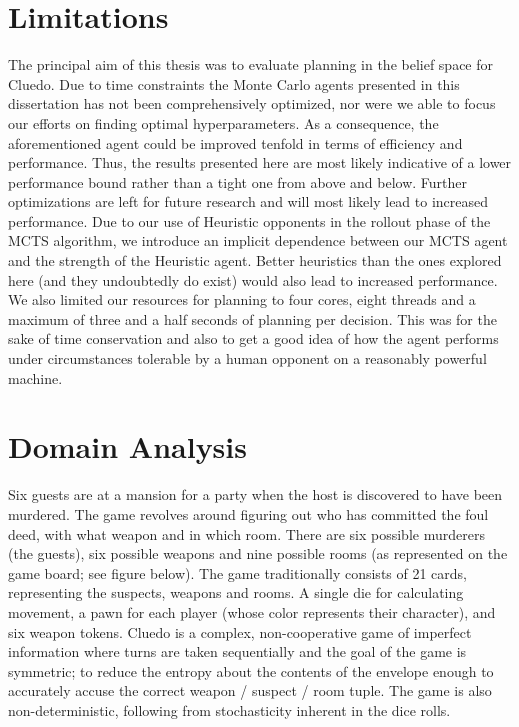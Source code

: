 \documentclass[msc, ai, twoside, notimes, logo, parskip, leftchapter, normalheadings]{infthesis}
\begin{document}
\section{Limitations}
The principal aim of this thesis was to evaluate planning in the belief space for Cluedo. Due to time constraints the Monte Carlo agents presented in this dissertation has not been comprehensively optimized, nor were we able to focus our efforts on finding optimal hyperparameters. As a consequence, the aforementioned agent could be improved tenfold in terms of efficiency and performance. Thus, the results presented here are most likely indicative of a lower performance bound rather than a tight one from above and below. Further optimizations are left for future research and will most likely lead to increased performance. Due to our use of Heuristic opponents in the rollout phase of the MCTS algorithm, we introduce an implicit dependence between our MCTS agent and the strength of the Heuristic agent. Better heuristics than the ones explored here (and they undoubtedly do exist) would also lead to increased performance. We also limited our resources for planning to four cores, eight threads and a maximum of three and a half seconds of planning per decision. This was for the sake of time conservation and also to get a good idea of how the agent performs under circumstances tolerable by a human opponent on a reasonably powerful machine. 

\section{Domain Analysis}
Six guests are at a mansion for a party when the host is discovered to have been murdered. The game revolves around figuring out who has committed the foul deed, with what weapon and in which room. There are six possible murderers (the guests), six possible weapons and nine possible rooms (as represented on the game board; see figure below). The game traditionally consists of 21 cards, representing the suspects, weapons and rooms. A single die for calculating movement, a pawn for each player (whose color represents their character), and six weapon tokens. Cluedo is a complex, non-cooperative game of imperfect information where turns are taken sequentially and the goal of the game is symmetric; to reduce the entropy about the contents of the envelope enough to accurately accuse the correct weapon / suspect / room tuple. The game is also non-deterministic, following from stochasticity inherent in the dice rolls.
\end{document}
